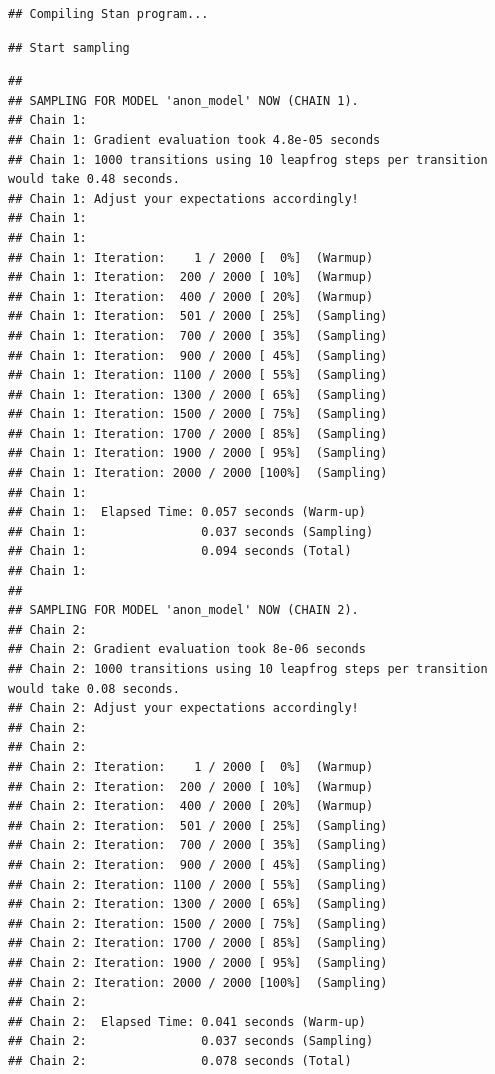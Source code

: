 \documentclass[
]{book}
\begin{document}
\begin{verbatim}
## Compiling Stan program...
\end{verbatim}

\begin{verbatim}
## Start sampling
\end{verbatim}

\begin{verbatim}
## 
## SAMPLING FOR MODEL 'anon_model' NOW (CHAIN 1).
## Chain 1: 
## Chain 1: Gradient evaluation took 4.8e-05 seconds
## Chain 1: 1000 transitions using 10 leapfrog steps per transition would take 0.48 seconds.
## Chain 1: Adjust your expectations accordingly!
## Chain 1: 
## Chain 1: 
## Chain 1: Iteration:    1 / 2000 [  0%]  (Warmup)
## Chain 1: Iteration:  200 / 2000 [ 10%]  (Warmup)
## Chain 1: Iteration:  400 / 2000 [ 20%]  (Warmup)
## Chain 1: Iteration:  501 / 2000 [ 25%]  (Sampling)
## Chain 1: Iteration:  700 / 2000 [ 35%]  (Sampling)
## Chain 1: Iteration:  900 / 2000 [ 45%]  (Sampling)
## Chain 1: Iteration: 1100 / 2000 [ 55%]  (Sampling)
## Chain 1: Iteration: 1300 / 2000 [ 65%]  (Sampling)
## Chain 1: Iteration: 1500 / 2000 [ 75%]  (Sampling)
## Chain 1: Iteration: 1700 / 2000 [ 85%]  (Sampling)
## Chain 1: Iteration: 1900 / 2000 [ 95%]  (Sampling)
## Chain 1: Iteration: 2000 / 2000 [100%]  (Sampling)
## Chain 1: 
## Chain 1:  Elapsed Time: 0.057 seconds (Warm-up)
## Chain 1:                0.037 seconds (Sampling)
## Chain 1:                0.094 seconds (Total)
## Chain 1: 
## 
## SAMPLING FOR MODEL 'anon_model' NOW (CHAIN 2).
## Chain 2: 
## Chain 2: Gradient evaluation took 8e-06 seconds
## Chain 2: 1000 transitions using 10 leapfrog steps per transition would take 0.08 seconds.
## Chain 2: Adjust your expectations accordingly!
## Chain 2: 
## Chain 2: 
## Chain 2: Iteration:    1 / 2000 [  0%]  (Warmup)
## Chain 2: Iteration:  200 / 2000 [ 10%]  (Warmup)
## Chain 2: Iteration:  400 / 2000 [ 20%]  (Warmup)
## Chain 2: Iteration:  501 / 2000 [ 25%]  (Sampling)
## Chain 2: Iteration:  700 / 2000 [ 35%]  (Sampling)
## Chain 2: Iteration:  900 / 2000 [ 45%]  (Sampling)
## Chain 2: Iteration: 1100 / 2000 [ 55%]  (Sampling)
## Chain 2: Iteration: 1300 / 2000 [ 65%]  (Sampling)
## Chain 2: Iteration: 1500 / 2000 [ 75%]  (Sampling)
## Chain 2: Iteration: 1700 / 2000 [ 85%]  (Sampling)
## Chain 2: Iteration: 1900 / 2000 [ 95%]  (Sampling)
## Chain 2: Iteration: 2000 / 2000 [100%]  (Sampling)
## Chain 2: 
## Chain 2:  Elapsed Time: 0.041 seconds (Warm-up)
## Chain 2:                0.037 seconds (Sampling)
## Chain 2:                0.078 seconds (Total)

\end{verbatim}
\end{document}
